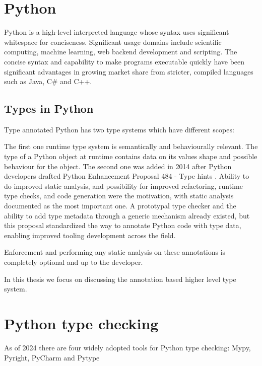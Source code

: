 
\section{Python}
Python is a high-level interpreted language whose syntax uses significant whitespace for conciseness. Significant usage domains include scientific computing, machine learning, web backend development and scripting. The concise syntax and capability to make programs executable quickly have been significant advantages in growing market share from stricter, compiled languages such as Java, C\# and C++.


\subsection{Types in Python}

Type annotated Python has two type systems which have different scopes:

The first one  runtime type system is semantically and behaviourally relevant. The type of a Python object at runtime contains data on its values shape and possible behaviour for the object. 
The second one was added in 2014 after Python developers drafted Python Enhancement Proposal 484 - Type hints \cite{pep_484}. Ability to do improved static analysis, and possibility for improved refactoring, runtime type checks, and code generation were the motivation, with static analysis documented as the most important one. A prototypal type checker and the ability to add type metadata through a generic mechanism already existed, but this proposal standardized the way to annotate Python code with type data, enabling improved tooling development across the field.

Enforcement and performing any static analysis on these annotations is completely optional and up to the developer\cite{python_typing}.

In this thesis we focus on discussing the annotation based higher level type system.

 
\section{Python type checking}
As of 2024 there are four widely adopted tools for Python type checking: Mypy, Pyright, PyCharm and Pytype %


